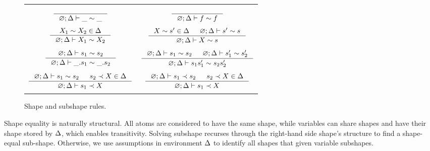 \documentclass[english, mgr]{iithesis}
\newcommand{\solverRule}{\vdash}
\begin{document}
\begin{figure}[htbp]
    \centering
    \begin{tabularx}{\textwidth}{|CC|}
      \hline & \\ $
      \inference{
      }{
        \emptyenv ; \icEnv \solverRule \shatom \csheq \shatom
      }
      $ & $
      \inference{
      }{
        \emptyenv ; \icEnv \solverRule \symb \csheq \symb
      }
      $ \\ & \\
      $
      \inference{
        \termv_1 \csheq \termv_2 \in \icEnv
      }{
        \emptyenv ; \icEnv \solverRule \termv_1 \csheq \termv_2
      }
      $ & $
      \inference{
        \termv  \csheq \shape' \in \icEnv
        &
        \emptyenv ; \icEnv \solverRule \shape'  \csheq \shape
      }{
        \emptyenv ; \icEnv \solverRule \termv  \csheq \shape
      }
      $ \\ & \\
      $\inference{
        \emptyenv ; \icEnv \solverRule \shape_1 \csheq \shape_2
      }{
        \emptyenv ; \icEnv \solverRule \shbind \shape_1 \csheq \shbind \shape_2
      }
      $ & $
      \inference{
        \emptyenv ; \icEnv \solverRule \shape_1 \csheq \shape_2
        &
        \emptyenv ; \icEnv \solverRule \shape_1' \csheq \shape_2'
      }{
        \emptyenv ; \icEnv \solverRule \shape_1 \shape_1' \csheq \shape_2 \shape_2'
      }
      $ \\ & \\ $
      \inference{
        \emptyenv ; \icEnv \solverRule \shape_1 \csheq \shape_2
        &
        \shape_2 \cshlt \termv \in \icEnv
      }{
        \emptyenv ; \icEnv \solverRule \shape_1 \cshlt \termv
      }
      $ & $
      \inference{
        \emptyenv ; \icEnv \solverRule \shape_1 \cshlt \shape_2
        &
        \shape_2 \cshlt \termv \in \icEnv
      }{
        \emptyenv ; \icEnv \solverRule \shape_1 \cshlt \termv
      }
      $ \\ & \\ \hline
      \end{tabularx}
  \caption{Shape and subshape rules.}
  \label{fig:shape-rules}
\end{figure}
Shape equality is naturally structural.
All atoms are considered to have the same shape, while
variables can share shapes and have their shape stored by $\Delta$,
which enables transitivity.
Solving subshape recurses through the right-hand side shape's structure to find a shape-equal sub-shape.
Otherwise, we use assumptions in environment $\Delta$ to identify all shapes that given variable subshapes.
\end{document}
